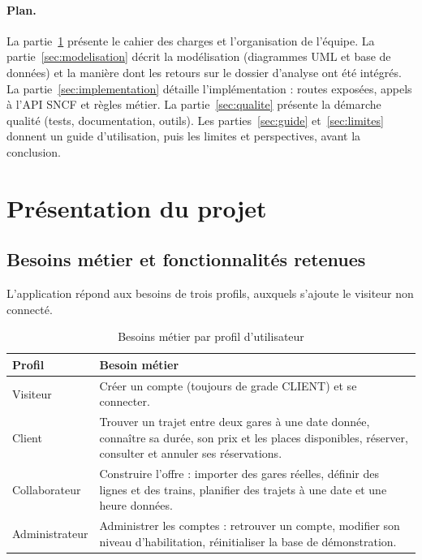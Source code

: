 \documentclass[11pt,a4paper]{article}
\begin{document}
\paragraph{Plan.}
La partie~\ref{sec:projet} présente le cahier des charges et l'organisation de l'équipe. La
partie~\ref{sec:modelisation} décrit la modélisation (diagrammes UML et base de données) et la
manière dont les retours sur le dossier d'analyse ont été intégrés. La
partie~\ref{sec:implementation} détaille l'implémentation : routes exposées, appels à l'API SNCF et
règles métier. La partie~\ref{sec:qualite} présente la démarche qualité (tests, documentation,
outils). Les parties~\ref{sec:guide} et~\ref{sec:limites} donnent un guide d'utilisation, puis les
limites et perspectives, avant la conclusion.

\section{Présentation du projet}\label{sec:projet}

\subsection{Besoins métier et fonctionnalités retenues}

L'application répond aux besoins de trois profils, auxquels s'ajoute le visiteur non connecté.

\begin{table}[H]
\centering\small
\begin{tabularx}{\textwidth}{@{}l Y@{}}
\toprule
\textbf{Profil} & \textbf{Besoin métier} \\
\midrule
Visiteur        & Créer un compte (toujours de grade CLIENT) et se connecter. \\
Client          & Trouver un trajet entre deux gares à une date donnée, connaître sa durée, son prix
                  et les places disponibles, réserver, consulter et annuler ses réservations. \\
Collaborateur   & Construire l'offre : importer des gares réelles, définir des lignes et des trains,
                  planifier des trajets à une date et une heure données. \\
Administrateur  & Administrer les comptes : retrouver un compte, modifier son niveau d'habilitation,
                  réinitialiser la base de démonstration. \\
\bottomrule
\end{tabularx}
\caption{Besoins métier par profil d'utilisateur}
\end{table}
\end{document}
